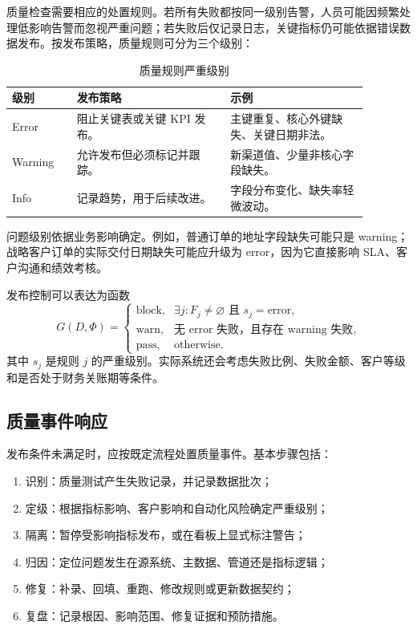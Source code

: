 质量检查需要相应的处置规则。若所有失败都按同一级别告警，人员可能因频繁处理低影响告警而忽视严重问题；若失败后仅记录日志，关键指标仍可能依据错误数据发布。按发布策略，质量规则可分为三个级别：

\begin{table}[htbp]
\centering
\caption{质量规则严重级别}
\begin{tabular}{P{0.16\linewidth}P{0.38\linewidth}P{0.34\linewidth}}
\toprule
{}
级别 & 发布策略 & 示例\\
\midrule

Error & 阻止关键表或关键 KPI 发布。 & 主键重复、核心外键缺失、关键日期非法。\\
Warning & 允许发布但必须标记并跟踪。 & 新渠道值、少量非核心字段缺失。\\
Info & 记录趋势，用于后续改进。 & 字段分布变化、缺失率轻微波动。\\
\bottomrule
\end{tabular}
\end{table}

问题级别依据业务影响确定。例如，普通订单的地址字段缺失可能只是 warning；战略客户订单的实际交付日期缺失可能应升级为 error，因为它直接影响 SLA、客户沟通和绩效考核。

发布控制可以表达为函数
\[
G(D,\Phi)=
\begin{cases}
\text{block}, & \exists j: F_j\ne \varnothing \text{ 且 } s_j=\text{error},\\
\text{warn}, & \text{无 error 失败，且存在 warning 失败},\\
\text{pass}, & \text{otherwise}.
\end{cases}
\]
其中 \(s_j\) 是规则 \(j\) 的严重级别。实际系统还会考虑失败比例、失败金额、客户等级和是否处于财务关账期等条件。

\subsection{质量事件响应}

发布条件未满足时，应按既定流程处置质量事件。基本步骤包括：
\begin{enumerate}
  \item 识别：质量测试产生失败记录，并记录数据批次；
  \item 定级：根据指标影响、客户影响和自动化风险确定严重级别；
  \item 隔离：暂停受影响指标发布，或在看板上显式标注警告；
  \item 归因：定位问题发生在源系统、主数据、管道还是指标逻辑；
  \item 修复：补录、回填、重跑、修改规则或更新数据契约；
  \item 复盘：记录根因、影响范围、修复证据和预防措施。
\end{enumerate}

